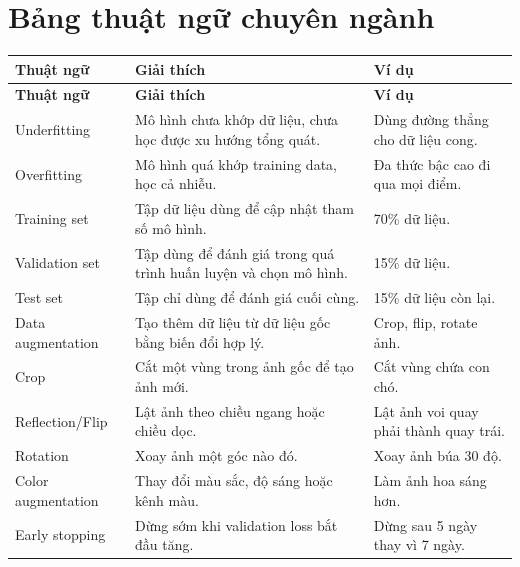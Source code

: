 \documentclass[12pt,a4paper]{report}
\begin{document}
\chapter{Bảng thuật ngữ chuyên ngành}

\small
\begin{longtable}{p{}p{}p{}}
\toprule
\textbf{Thuật ngữ} & \textbf{Giải thích} & \textbf{Ví dụ} \\
\midrule
\endfirsthead

\toprule
\textbf{Thuật ngữ} & \textbf{Giải thích} & \textbf{Ví dụ} \\
\midrule
\endhead

Underfitting & Mô hình chưa khớp dữ liệu, chưa học được xu hướng tổng quát. & Dùng đường thẳng cho dữ liệu cong. \\

Overfitting & Mô hình quá khớp training data, học cả nhiễu. & Đa thức bậc cao đi qua mọi điểm. \\

Training set & Tập dữ liệu dùng để cập nhật tham số mô hình. & 70\% dữ liệu. \\

Validation set & Tập dùng để đánh giá trong quá trình huấn luyện và chọn mô hình. & 15\% dữ liệu. \\

Test set & Tập chỉ dùng để đánh giá cuối cùng. & 15\% dữ liệu còn lại. \\

Data augmentation & Tạo thêm dữ liệu từ dữ liệu gốc bằng biến đổi hợp lý. & Crop, flip, rotate ảnh. \\

Crop & Cắt một vùng trong ảnh gốc để tạo ảnh mới. & Cắt vùng chứa con chó. \\

Reflection/Flip & Lật ảnh theo chiều ngang hoặc chiều dọc. & Lật ảnh voi quay phải thành quay trái. \\

Rotation & Xoay ảnh một góc nào đó. & Xoay ảnh búa 30 độ. \\

Color augmentation & Thay đổi màu sắc, độ sáng hoặc kênh màu. & Làm ảnh hoa sáng hơn. \\

Early stopping & Dừng sớm khi validation loss bắt đầu tăng. & Dừng sau 5 ngày thay vì 7 ngày. \\


\end{longtable}
\end{document}
